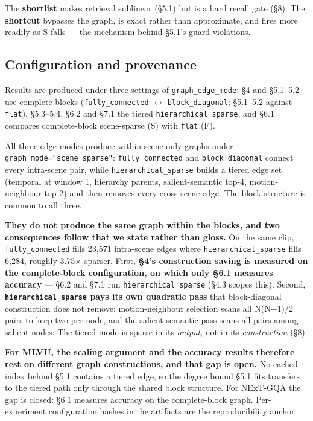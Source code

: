 \documentclass[sigconf,review,anonymous]{acmart}
\begin{document}
The \textbf{shortlist} makes retrieval sublinear (§5.1) but is a hard recall gate (§8). The
\textbf{shortcut} bypasses the graph, is exact rather than approximate, and fires more readily as
S falls --- the mechanism behind §5.1's guard violations.

\subsection{Configuration and provenance}

Results are produced under three settings of \texttt{graph\_edge\_mode}: §4 and §5.1--5.2 use
complete blocks (\texttt{fully\_connected} \ensuremath{\leftrightarrow} \texttt{block\_diagonal}; §5.1--5.2 against \texttt{flat}),
§5.3--5.4, §6.2 and §7.1 the tiered \texttt{hierarchical\_sparse}, and §6.1 compares complete-block
scene-sparse (S) with \texttt{flat} (F).

All three edge modes produce within-scene-only graphs under \texttt{graph\_mode="scene\_sparse"}:
\texttt{fully\_connected} and \texttt{block\_diagonal} connect every intra-scene pair, while
\texttt{hierarchical\_sparse} builds a tiered edge set (temporal at window 1, hierarchy parents,
salient-semantic top-4, motion-neighbour top-2) and then removes every cross-scene edge. The
block structure is common to all three.

\textbf{They do not produce the same graph within the blocks, and two consequences follow that we
state rather than gloss.} On the same clip, \texttt{fully\_connected} fills 23,571 intra-scene edges
where \texttt{hierarchical\_sparse} fills 6,284, roughly 3.75\ensuremath{\times} sparser. First, \textbf{§4's construction
saving is measured on the complete-block configuration, on which only §6.1 measures
accuracy} --- §6.2 and §7.1 run \texttt{hierarchical\_sparse} (§4.3 scopes this). Second,
\textbf{\texttt{hierarchical\_sparse} pays its own quadratic pass} that block-diagonal construction does
not remove: motion-neighbour selection scans all N(N\ensuremath{-}1)/2 pairs to keep two per node, and the
salient-semantic pass scans all pairs among salient nodes. The tiered mode is sparse in its
\emph{output}, not in its \emph{construction} (§8).

\textbf{For MLVU, the scaling argument and the accuracy results therefore rest on different
graph constructions, and that gap is open.} No cached index behind §5.1 contains a tiered edge,
so the degree bound §5.1 fits transfers to the tiered path only through the shared block
structure. For NExT-GQA the gap is closed: §6.1 measures accuracy on the complete-block graph.
Per-experiment configuration hashes in the artifacts are the reproducibility anchor.
\end{document}
